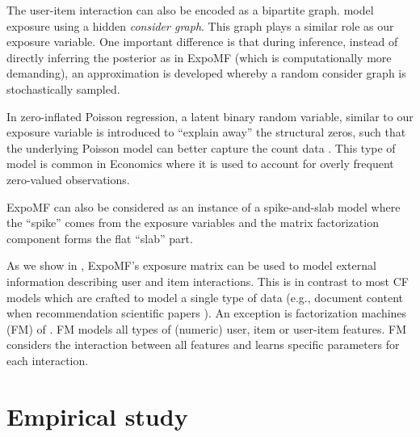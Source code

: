  The user-item
interaction can also be encoded as a bipartite graph.
\citet{paquet2013one} model exposure using a hidden \emph{consider graph}.
This graph plays a similar role as our exposure variable. One important
difference is that during inference, instead of directly inferring the
posterior as in ExpoMF (which is computationally more demanding), an
approximation is developed whereby a random consider graph is
stochastically sampled.


 In zero-inflated Poisson regression, a
latent binary random variable, similar to our exposure variable is introduced to ``explain away'' the structural zeros, such that the
underlying Poisson model can better capture the count data
\citep{lambert1992zero}. This type of model is common in Economics where it is used to account for overly frequent zero-valued observations.  

ExpoMF can also be considered as an instance of a spike-and-slab model \citep{ishwaran2005spike} where the ``spike'' comes from the exposure variables and the matrix factorization component forms the flat ``slab'' part. 

 As we show in ,
ExpoMF's exposure matrix can be used to model external information describing user
and item interactions. This is in contrast to most CF models which are
crafted to model a single type of data (e.g., document content when
recommendation scientific papers \citep{wang2011collaborative}). An exception is
factorization machines (FM) of \citet{rendle2010fm}. FM models all types of
(numeric) user, item or user-item features. FM considers the interaction
between all features and learns specific parameters for each interaction.


\section{Empirical study}
\label{chpt:expomf:sec:exp}

